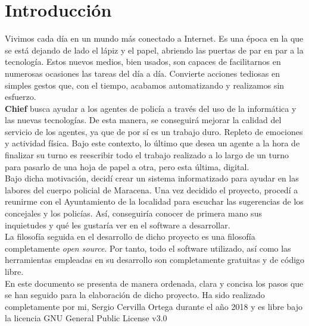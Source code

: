 \chapter{Introducción}

Vivimos cada día en un mundo más conectado a Internet. Es una época en la que se está dejando de 
lado el lápiz y el papel, abriendo las puertas de par en par a la tecnología. Estos nuevos medios, bien
usados, son capaces de facilitarnos en numerosas ocasiones las tareas del día a día. Convierte acciones
tediosas en simples gestos que, con el tiempo, acabamos automatizando y realizamos sin esfuerzo.\\ 

\textbf{Chief} busca ayudar a los agentes de policía a través del uso de la informática y las nuevas tecnologías. De esta manera, se conseguirá mejorar la calidad del servicio de los agentes, ya que de por sí es un 
trabajo duro. Repleto de emociones y actividad física. Bajo este contexto, lo último que desea un
agente a la hora de finalizar su turno es reescribir todo el trabajo realizado a lo largo de un 
turno para pasarlo de una hoja de papel a otra, pero esta última, digital.\\ 

Bajo dicha motivación, decidí crear un sistema informatizado para ayudar en las labores del cuerpo 
policial de Maracena. Una vez decidido el proyecto, procedí a reunirme con el Ayuntamiento de la 
localidad para escuchar las sugerencias de los  concejales y los policías. Así, conseguiría conocer de 
primera mano  sus inquietudes y qué les gustaría ver en el software a desarrollar.\\

La filosofía seguida en el desarrollo de dicho proyecto es una filosofía completamente \textit{open source}.
Por tanto, todo el software utilizado, así como las herramientas empleadas en su desarrollo son completamente
gratuitas y de código libre.\\ 


En este documento se presenta de manera ordenada, clara y concisa los pasos que se han seguido para
la elaboración de dicho proyecto. Ha sido realizado completamente por mi, Sergio Cervilla Ortega durante 
el año 2018 y es libre bajo la licencia GNU General Public License v3.0 \cite{gplv3}\\ 


